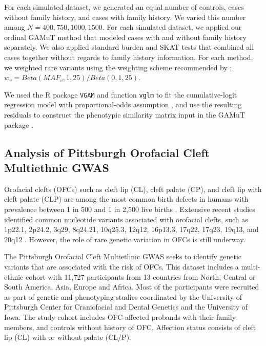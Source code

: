 \documentclass[]{article}
\theoremstyle{definition}
\theoremstyle{definition}
\theoremstyle{definition}
\theoremstyle{remark}
\begin{document}
For each simulated dataset, we generated an equal number of controls,
cases without family history, and cases with family history. We varied
this number among \(N=400, 750, 1000, 1500\). For each simulated
dataset, we applied our ordinal GAMuT method that modeled cases with and
without family history separately. We also applied standard burden and
SKAT tests that combined all cases together without regards to family
history information. For each method, we weighted rare variants using
the weighting scheme recommended by \citet{Wu2011};
\(w_v=Beta(MAF_v,1,25)/Beta(0,1,25)\).

We used the R package \texttt{VGAM} and function \texttt{vglm} to fit
the cumulative-logit regression model with proportional-odds assumption
\citep{Yee2010}, and use the resulting residuals to construct the
phenotypic similarity matrix input in the GAMuT package
\citep{Broadaway2016}.

\hypertarget{analysis-of-pittsburgh-orofacial-cleft-multiethnic-gwas}{%
\subsection{Analysis of Pittsburgh Orofacial Cleft Multiethnic
GWAS}\label{analysis-of-pittsburgh-orofacial-cleft-multiethnic-gwas}}

Orofacial clefts (OFCs) such as cleft lip (CL), cleft palate (CP), and
cleft lip with cleft palate (CLP) are among the most common birth
defects in humans with prevalence between 1 in 500 and 1 in 2,500 live
births \citep{Tessier1976, Mossey2009}. Extensive recent studies
identified common nucleotide variants associated with orofacial clefts,
such as 1p22.1, 2p24.2, 3q29, 8q24.21, 10q25.3, 12q12, 16p13.3, 17q22,
17q23, 19q13, and 20q12
\citep{Birnbaum2009, Grant2009, Beaty2010, Mangold2009, Wolf2015, Leslie2016, Leslie2016b, Mostowska2018}.
However, the role of rare genetic variation in OFCs is still underway.

The Pittsburgh Orofacial Cleft Multiethnic GWAS
\citep{Leslie2016, Leslie2016b} seeks to identify genetic variants that
are associated with the risk of OFCs. This dataset includes a
multi-ethnic cohort with 11,727 participants from 13 countries from
North, Central or South America. Asia, Europe and Africa. Most of the
participants were recruited as part of genetic and phenotyping studies
coordinated by the University of Pittsburgh Center for Craniofacial and
Dental Genetics and the University of Iowa. The study cohort includes
OFC-affected probands with their family members, and controls without
history of OFC. Affection status consists of cleft lip (CL) with or
without palate (CL/P).
\end{document}
